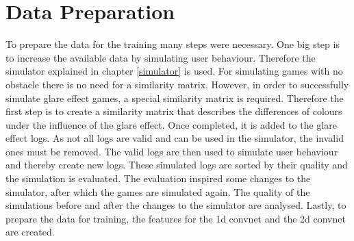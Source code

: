\chapter{Data Preparation}
\label{data_preparation}
%	
%	
To prepare the data for the training many steps were necessary. One big step is to increase the available data by simulating user behaviour. Therefore the simulator explained in chapter \ref{simulator}  is used. For simulating games with no obstacle there is no need for a similarity matrix. However, in order to successfully simulate glare effect games, a special similarity matrix is required. Therefore the first step is to create a similarity matrix that describes the differences of colours under the influence of the glare effect. Once completed, it is added to the glare effect logs. As not all logs are valid and can be used in the simulator, the invalid ones must be removed. The valid logs are then used to simulate user behaviour and thereby create new logs. These simulated logs are sorted by their quality and the simulation is evaluated. The evaluation inspired some changes to the simulator, after which the games are simulated again. The quality of the simulations before and after the changes to the simulator are analysed. Lastly, to prepare the data for training, the features for the 1d convnet and the 2d convnet are created. 


